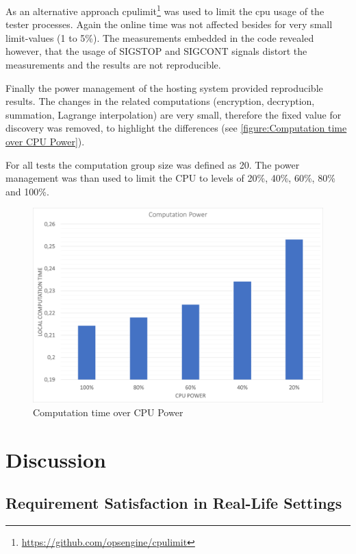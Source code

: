 As an alternative approach cpulimit\footnote{\url{https://github.com/opsengine/cpulimit}} was used to limit the cpu usage of the tester processes. Again the online time was not affected besides for very small limit-values (1 to 5\%). The measurements embedded in the code revealed however, that the usage of SIGSTOP and SIGCONT signals distort the measurements and the results are not reproducible.

Finally the power management of the hosting system provided reproducible results. The changes in the related computations (encryption, decryption, summation, Lagrange interpolation) are very small, therefore the fixed value for discovery was removed, to highlight the differences (see \autoref{figure:Computation time over CPU Power}).

For all tests the computation group size was defined as 20. The power management was than used to limit the CPU to levels of 20\%, 40\%, 60\%, 80\% and 100\%.
\begin{figure}[!htbp] %
	\caption{Computation time over CPU Power} \label{figure:Computation time over CPU Power}
	\includegraphics[scale=1.0]{figures/eval_power.png}
\end{figure}

\FloatBarrier

\chapter{Discussion} \label{Discussion}


\section{Requirement Satisfaction in Real-Life Settings} \label{Requirement Satisfaction in Real-Life Settings}

